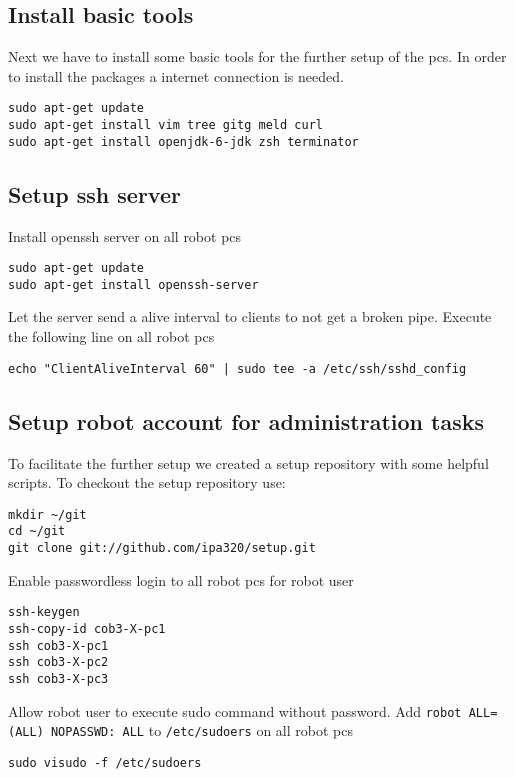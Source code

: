 \subsection{Install basic tools}
Next we have to install some basic tools for the further setup of the pcs. In order to install the packages a internet connection is needed.

\begin{lstlisting}
sudo apt-get update
sudo apt-get install vim tree gitg meld curl
sudo apt-get install openjdk-6-jdk zsh terminator
\end{lstlisting}

\subsection{Setup ssh server}
Install openssh server on all robot pcs
\begin{lstlisting}
sudo apt-get update
sudo apt-get install openssh-server
\end{lstlisting}
Let the server send a alive interval to clients to not get a broken pipe. Execute the following line on all robot pcs
\begin{lstlisting}
echo "ClientAliveInterval 60" | sudo tee -a /etc/ssh/sshd_config
\end{lstlisting}

\subsection{Setup robot account for administration tasks}
To facilitate the further setup we created a setup repository with some helpful scripts. To checkout the setup repository use:

\begin{lstlisting}
mkdir ~/git
cd ~/git
git clone git://github.com/ipa320/setup.git
\end{lstlisting}

Enable passwordless login to all robot pcs for robot user
\begin{lstlisting}
ssh-keygen
ssh-copy-id cob3-X-pc1
ssh cob3-X-pc1
ssh cob3-X-pc2
ssh cob3-X-pc3
\end{lstlisting}

Allow robot user to execute sudo command without password. Add \texttt{robot ALL=(ALL) NOPASSWD: ALL} to \texttt{/etc/sudoers} on all robot pcs
\begin{lstlisting}
sudo visudo -f /etc/sudoers
\end{lstlisting}

